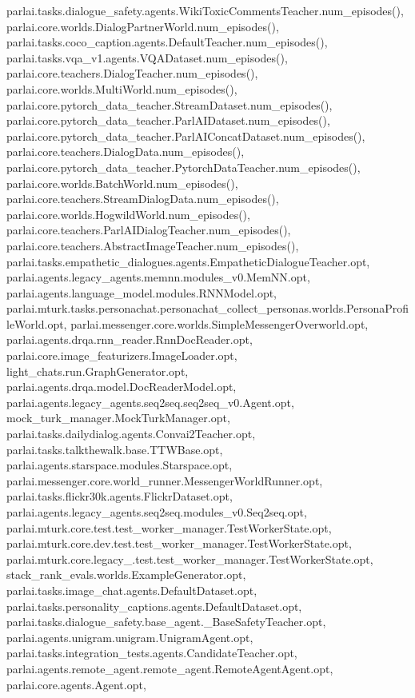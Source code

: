 parlai.\+tasks.\+dialogue\+\_\+safety.\+agents.\+Wiki\+Toxic\+Comments\+Teacher.\+num\+\_\+episodes(), parlai.\+core.\+worlds.\+Dialog\+Partner\+World.\+num\+\_\+episodes(), parlai.\+tasks.\+coco\+\_\+caption.\+agents.\+Default\+Teacher.\+num\+\_\+episodes(), parlai.\+tasks.\+vqa\+\_\+v1.\+agents.\+V\+Q\+A\+Dataset.\+num\+\_\+episodes(), parlai.\+core.\+teachers.\+Dialog\+Teacher.\+num\+\_\+episodes(), parlai.\+core.\+worlds.\+Multi\+World.\+num\+\_\+episodes(), parlai.\+core.\+pytorch\+\_\+data\+\_\+teacher.\+Stream\+Dataset.\+num\+\_\+episodes(), parlai.\+core.\+pytorch\+\_\+data\+\_\+teacher.\+Parl\+A\+I\+Dataset.\+num\+\_\+episodes(), parlai.\+core.\+pytorch\+\_\+data\+\_\+teacher.\+Parl\+A\+I\+Concat\+Dataset.\+num\+\_\+episodes(), parlai.\+core.\+teachers.\+Dialog\+Data.\+num\+\_\+episodes(), parlai.\+core.\+pytorch\+\_\+data\+\_\+teacher.\+Pytorch\+Data\+Teacher.\+num\+\_\+episodes(), parlai.\+core.\+worlds.\+Batch\+World.\+num\+\_\+episodes(), parlai.\+core.\+teachers.\+Stream\+Dialog\+Data.\+num\+\_\+episodes(), parlai.\+core.\+worlds.\+Hogwild\+World.\+num\+\_\+episodes(), parlai.\+core.\+teachers.\+Parl\+A\+I\+Dialog\+Teacher.\+num\+\_\+episodes(), parlai.\+core.\+teachers.\+Abstract\+Image\+Teacher.\+num\+\_\+episodes(), parlai.\+tasks.\+empathetic\+\_\+dialogues.\+agents.\+Empathetic\+Dialogue\+Teacher.\+opt, parlai.\+agents.\+legacy\+\_\+agents.\+memnn.\+modules\+\_\+v0.\+Mem\+N\+N.\+opt, parlai.\+agents.\+language\+\_\+model.\+modules.\+R\+N\+N\+Model.\+opt, parlai.\+mturk.\+tasks.\+personachat.\+personachat\+\_\+collect\+\_\+personas.\+worlds.\+Persona\+Profile\+World.\+opt, parlai.\+messenger.\+core.\+worlds.\+Simple\+Messenger\+Overworld.\+opt, parlai.\+agents.\+drqa.\+rnn\+\_\+reader.\+Rnn\+Doc\+Reader.\+opt, parlai.\+core.\+image\+\_\+featurizers.\+Image\+Loader.\+opt, light\+\_\+chats.\+run.\+Graph\+Generator.\+opt, parlai.\+agents.\+drqa.\+model.\+Doc\+Reader\+Model.\+opt, parlai.\+agents.\+legacy\+\_\+agents.\+seq2seq.\+seq2seq\+\_\+v0.\+Agent.\+opt, mock\+\_\+turk\+\_\+manager.\+Mock\+Turk\+Manager.\+opt, parlai.\+tasks.\+dailydialog.\+agents.\+Convai2\+Teacher.\+opt, parlai.\+tasks.\+talkthewalk.\+base.\+T\+T\+W\+Base.\+opt, parlai.\+agents.\+starspace.\+modules.\+Starspace.\+opt, parlai.\+messenger.\+core.\+world\+\_\+runner.\+Messenger\+World\+Runner.\+opt, parlai.\+tasks.\+flickr30k.\+agents.\+Flickr\+Dataset.\+opt, parlai.\+agents.\+legacy\+\_\+agents.\+seq2seq.\+modules\+\_\+v0.\+Seq2seq.\+opt, parlai.\+mturk.\+core.\+test.\+test\+\_\+worker\+\_\+manager.\+Test\+Worker\+State.\+opt, parlai.\+mturk.\+core.\+dev.\+test.\+test\+\_\+worker\+\_\+manager.\+Test\+Worker\+State.\+opt, parlai.\+mturk.\+core.\+legacy\+\_.\+test.\+test\+\_\+worker\+\_\+manager.\+Test\+Worker\+State.\+opt, stack\+\_\+rank\+\_\+evals.\+worlds.\+Example\+Generator.\+opt, parlai.\+tasks.\+image\+\_\+chat.\+agents.\+Default\+Dataset.\+opt, parlai.\+tasks.\+personality\+\_\+captions.\+agents.\+Default\+Dataset.\+opt, parlai.\+tasks.\+dialogue\+\_\+safety.\+base\+\_\+agent.\+\_\+\+Base\+Safety\+Teacher.\+opt, parlai.\+agents.\+unigram.\+unigram.\+Unigram\+Agent.\+opt, parlai.\+tasks.\+integration\+\_\+tests.\+agents.\+Candidate\+Teacher.\+opt, parlai.\+agents.\+remote\+\_\+agent.\+remote\+\_\+agent.\+Remote\+Agent\+Agent.\+opt, parlai.\+core.\+agents.\+Agent.\+opt, 